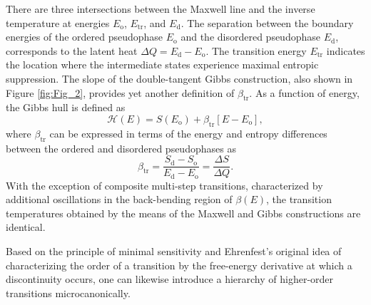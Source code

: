 \documentclass[12pt]{report}
\begin{document}
There are three intersections between the Maxwell line and the inverse temperature at energies $E_{\mathrm{o}}$, $E_{\mathrm{tr}}$, and $E_{\mathrm{d}}$. The separation between the boundary energies of the ordered pseudophase $E_{\mathrm{o}}$ and the disordered pseudophase $E_{\mathrm{d}}$, corresponds to the latent heat $\Delta Q = E_{\mathrm{d}} - E_{\mathrm{o}}$. The transition energy $E_{\mathrm{tr}}$ indicates the location where the intermediate states experience maximal entropic suppression.
The slope of the double-tangent Gibbs construction, also shown in Figure \ref{fig:Fig_2}, provides yet another definition of $\beta_{\mathrm{tr}}$. As a function of energy, the Gibbs hull is defined as
\begin{equation}
\mathcal{H}(E) = S(E_{\mathrm{o}}) + \beta_{\mathrm{tr}}[E-E_{\mathrm{o}}],
\end{equation}
where $\beta_{\mathrm{tr}}$ can be expressed in terms of the energy and entropy differences between the ordered and disordered pseudophases as
\begin{equation}
\beta_{\mathrm{tr}} = \frac{S_{\mathrm{d}}-S_{\mathrm{o}}}{E_{\mathrm{d}}-E_{\mathrm{o}}} = \frac{\Delta S}{\Delta Q}.
\end{equation}
With the exception of composite multi-step transitions, characterized by additional oscillations in the back-bending region of $\beta(E)$, the transition temperatures obtained by the means of the Maxwell and Gibbs constructions are identical.

 Based on the principle of minimal sensitivity and Ehrenfest's original idea of characterizing the order of a transition by the free-energy derivative at which a discontinuity occurs, one can likewise introduce a hierarchy of higher-order transitions microcanonically.
 
 
\end{document}
